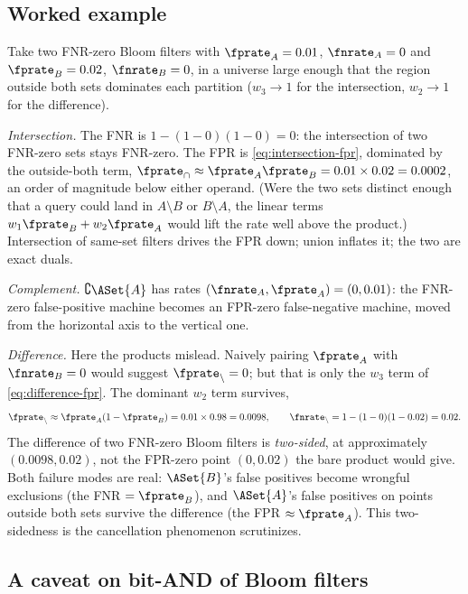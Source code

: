 \subsection*{Worked example}

Take two FNR-zero Bloom filters with $\fprate_A = 0.01$, $\fnrate_A = 0$ and
$\fprate_B = 0.02$, $\fnrate_B = 0$, in a universe large enough that the
region outside both sets dominates each partition ($w_3 \to 1$ for the
intersection, $w_2 \to 1$ for the difference).

\emph{Intersection.} The FNR is $1 - (1 - 0)(1 - 0) = 0$: the intersection of
two FNR-zero sets stays FNR-zero. The FPR is
\eqref{eq:intersection-fpr}, dominated by the outside-both term,
$\fprate_\cap \approx \fprate_A \fprate_B = 0.01 \times 0.02 = 0.0002$, an
order of magnitude below either operand. (Were the two sets distinct enough
that a query could land in $A \setminus B$ or $B \setminus A$, the linear
terms $w_1 \fprate_B + w_2 \fprate_A$ would lift the rate well above the
product.) Intersection of same-set filters drives the FPR down; union
inflates it; the two are exact duals.

\emph{Complement.} $\complement \ASet{A}$ has rates $(\fnrate_A, \fprate_A) =
(0, 0.01)$: the FNR-zero false-positive machine becomes an FPR-zero
false-negative machine, moved from the horizontal axis to the vertical one.

\emph{Difference.} Here the products mislead. Naively pairing $\fprate_A$
with $\fnrate_B = 0$ would suggest $\fprate_\setminus = 0$; but that is only
the $w_3$ term of \eqref{eq:difference-fpr}. The dominant $w_2$ term survives,
\[
  \fprate_\setminus \approx \fprate_A (1 - \fprate_B)
                    = 0.01 \times 0.98 = 0.0098,
  \qquad
  \fnrate_\setminus = 1 - (1 - 0)(1 - 0.02) = 0.02.
\]
The difference of two FNR-zero Bloom filters is \emph{two-sided}, at
approximately $(0.0098, 0.02)$, not the FPR-zero point $(0, 0.02)$ the bare
product would give. Both failure modes are real: $\ASet{B}$'s false positives
become wrongful exclusions (the FNR $= \fprate_B$), and $\ASet{A}$'s false
positives on points outside both sets survive the difference (the FPR
$\approx \fprate_A$). This two-sidedness is the cancellation phenomenon
 scrutinizes.

\subsection*{A caveat on bit-AND of Bloom filters}

